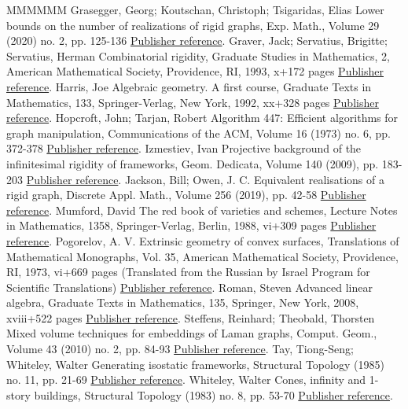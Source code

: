 \documentclass[11pt]{article}
\theoremstyle{definition}
\numberwithin{equation}{section}
\begin{document}
\begin{thebibliography}{MMMMMM}
 Grasegger, Georg; Koutschan, Christoph; Tsigaridas, Elias Lower bounds on the number of realizations of rigid graphs, Exp. Math., Volume 29 (2020) no. 2, pp. 125-136 \href{https://alco.centre-mersenne.org/articles/10.5802/alco.390/#LowerBounds}{Publisher reference}.
 Graver, Jack; Servatius, Brigitte; Servatius, Herman Combinatorial rigidity, Graduate Studies in Mathematics, 2, American Mathematical Society, Providence, RI, 1993, x+172 pages \href{https://alco.centre-mersenne.org/articles/10.5802/alco.390/#GraverServatius}{Publisher reference}.
 Harris, Joe Algebraic geometry. A first course, Graduate Texts in Mathematics, 133, Springer-Verlag, New York, 1992, xx+328 pages \href{https://alco.centre-mersenne.org/articles/10.5802/alco.390/#Harris}{Publisher reference}.
 Hopcroft, John; Tarjan, Robert Algorithm 447: Efficient algorithms for graph manipulation, Communications of the ACM, Volume 16 (1973) no. 6, pp. 372-378 \href{https://alco.centre-mersenne.org/articles/10.5802/alco.390/#HopcroftTarjan}{Publisher reference}.
 Izmestiev, Ivan Projective background of the infinitesimal rigidity of frameworks, Geom. Dedicata, Volume 140 (2009), pp. 183-203 \href{https://alco.centre-mersenne.org/articles/10.5802/alco.390/#Izm09}{Publisher reference}.
 Jackson, Bill; Owen, J. C. Equivalent realisations of a rigid graph, Discrete Appl. Math., Volume 256 (2019), pp. 42-58 \href{https://alco.centre-mersenne.org/articles/10.5802/alco.390/#JacksonOwen}{Publisher reference}.
 Mumford, David The red book of varieties and schemes, Lecture Notes in Mathematics, 1358, Springer-Verlag, Berlin, 1988, vi+309 pages \href{https://alco.centre-mersenne.org/articles/10.5802/alco.390/#mumford}{Publisher reference}.
 Pogorelov, A. V. Extrinsic geometry of convex surfaces, Translations of Mathematical Monographs, Vol. 35, American Mathematical Society, Providence, RI, 1973, vi+669 pages (Translated from the Russian by Israel Program for Scientific Translations) \href{https://alco.centre-mersenne.org/articles/10.5802/alco.390/#Pog73}{Publisher reference}.
 Roman, Steven Advanced linear algebra, Graduate Texts in Mathematics, 135, Springer, New York, 2008, xviii+522 pages \href{https://alco.centre-mersenne.org/articles/10.5802/alco.390/#roman}{Publisher reference}.
 Steffens, Reinhard; Theobald, Thorsten Mixed volume techniques for embeddings of Laman graphs, Comput. Geom., Volume 43 (2010) no. 2, pp. 84-93 \href{https://alco.centre-mersenne.org/articles/10.5802/alco.390/#Steffens2010}{Publisher reference}.
 Tay, Tiong-Seng; Whiteley, Walter Generating isostatic frameworks, Structural Topology (1985) no. 11, pp. 21-69 \href{https://alco.centre-mersenne.org/articles/10.5802/alco.390/#TayWhite85}{Publisher reference}.
 Whiteley, Walter Cones, infinity and 1-story buildings, Structural Topology (1983) no. 8, pp. 53-70 \href{https://alco.centre-mersenne.org/articles/10.5802/alco.390/#coning}{Publisher reference}.
\end{thebibliography}
\end{document}
